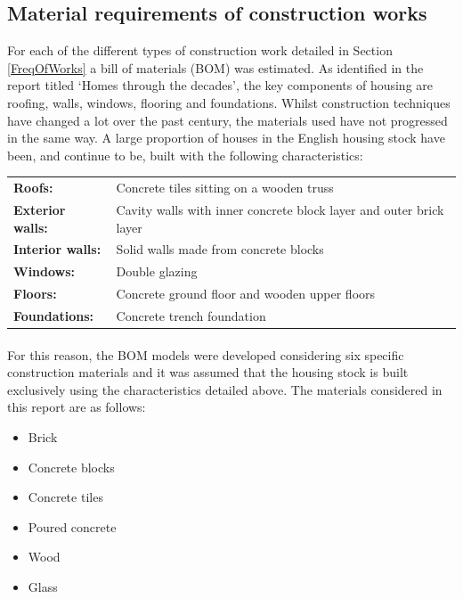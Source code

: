 \documentclass[12pt]{article}
\begin{document}
\subsection{Material requirements of construction works}
\label{MaterialReqs}

For each of the different types of construction work detailed in Section \ref{FreqOfWorks} a bill of materials (BOM) was estimated. As identified in the \citet{nhbc_2015-cg} report titled ‘Homes through the decades’, the key components of housing are roofing, walls, windows, flooring and foundations. Whilst construction techniques have changed a lot over the past century, the materials used have not progressed in the same way. A large proportion of houses in the English housing stock have been, and continue to be, built with the following characteristics:

\vspace{2mm}
\begingroup
\linespread{1}
\begin{table}[htbp]
  \centering
    \begin{tabular}{L{0.19\textwidth} L{0.75\textwidth}}
    \textbf{Roofs:} & Concrete tiles sitting on a wooden truss \\
    \textbf{Exterior walls:} & Cavity walls with inner concrete block layer and outer brick layer \\
    \textbf{Interior walls:} & Solid walls made from concrete blocks \\
    \textbf{Windows:} & Double glazing \\
    \textbf{Floors:} & Concrete ground floor and wooden upper floors \\
    \textbf{Foundations:} & Concrete trench foundation \\
    \end{tabular}%
  \label{tab:Characteristics}%
\end{table}%
\endgroup

\vspace*{-7mm}

\paragraph{}
For this reason, the BOM models were developed considering six specific construction materials and it was assumed that the housing stock is built exclusively using the characteristics detailed above. The materials considered in this report are as follows:

\begin{multicols}{2}
\begin{itemize}
\itemsep0em
    \item Brick
	\item Concrete blocks
	\item Concrete tiles
	\item Poured concrete
	\item Wood
	\item Glass
\end{itemize}
\end{multicols}
\end{document}
